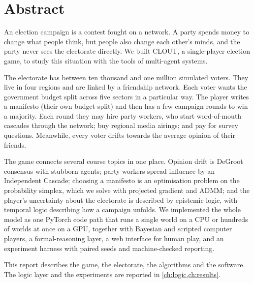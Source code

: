 \documentclass[11pt,a4paper,oneside]{report}
\begin{document}

\chapter*{Abstract}

An election campaign is a contest fought on a network. A party spends money to change what people think,
but people also change each other's minds, and the party never sees the electorate directly. We built
CLOUT, a single-player election game, to study this situation with the tools of multi-agent systems.

The electorate has between ten thousand and one million simulated voters. They live in four regions and
are linked by a friendship network. Each voter wants the government budget split across five sectors in a
particular way. The player writes a manifesto (their own budget split) and then has a few campaign rounds
to win a majority. Each round they may hire party workers, who start word-of-mouth cascades through the
network; buy regional media airings; and pay for survey questions. Meanwhile, every voter drifts towards
the average opinion of their friends.

The game connects several course topics in one place. Opinion drift is DeGroot consensus with stubborn
agents; party workers spread influence by an Independent Cascade; choosing a manifesto is an optimisation
problem on the probability simplex, which we solve with projected gradient and ADMM; and the player's
uncertainty about the electorate is described by epistemic logic, with temporal logic describing how a
campaign unfolds. We implemented the whole model as one PyTorch code path that runs a single world on a CPU
or hundreds of worlds at once on a GPU, together with Bayesian and scripted computer players, a
formal-reasoning layer, a web interface for human play, and an experiment harness with paired seeds and
machine-checked reporting.

This report describes the game, the electorate, the algorithms and the software. The logic layer and the
experiments are reported in \cref{ch:logic,ch:results}.

\tableofcontents
\clearpage
\listoffigures
\listoftables
\listofalgorithms
\clearpage
{}

\end{document}
